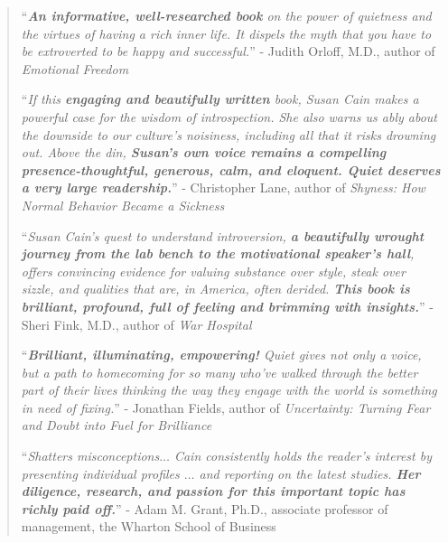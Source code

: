 \documentclass[oneside]{article}
\numberwithin{equation}{section}
\begin{document}
\begin{quotation}
    ``\textit{\textbf{An informative, well-researched book} on the power of quietness and the virtues of having a rich inner life. It dispels the myth that you have to be extroverted to be happy and successful.}'' - Judith Orloff, M.D., author of \textit{Emotional Freedom}
    
    ``\textit{If this \textbf{engaging and beautifully written} book, Susan Cain makes a powerful case for the wisdom of introspection. She also warns us ably about the downside to our culture's noisiness, including all that it risks drowning out. Above the din, \textbf{Susan's own voice remains a compelling presence-thoughtful, generous, calm, and eloquent. \emph{Quiet} deserves a very large readership.}}'' - Christopher Lane, author of \textit{Shyness: How Normal Behavior Became a Sickness}
    
    ``\textit{Susan Cain's quest to understand introversion, \textbf{a beautifully wrought journey from the lab bench to the motivational speaker's hall}, offers convincing evidence for valuing substance over style, steak over sizzle, and qualities that are, in America, often derided. \textbf{This book is brilliant, profound, full of feeling and brimming with insights.}}'' - Sheri Fink, M.D., author of \textit{War Hospital}
    
    ``\textit{\textbf{Brilliant, illuminating, empowering!} \emph{Quiet} gives not only a voice, but a path to homecoming for so many who've walked through the better part of their lives thinking the way they engage with the world is something in need of fixing.}'' - Jonathan Fields, author of \textit{Uncertainty: Turning Fear and Doubt into Fuel for Brilliance}
    
    ``\textit{Shatters misconceptions$\ldots$ Cain consistently holds the reader's interest by presenting individual profiles $\ldots$ and reporting on the latest studies. \textbf{Her diligence, research, and passion for this important topic has richly paid off.}}'' - Adam M. Grant, Ph.D., associate professor of management, the Wharton School of Business
\end{quotation}
\end{document}
